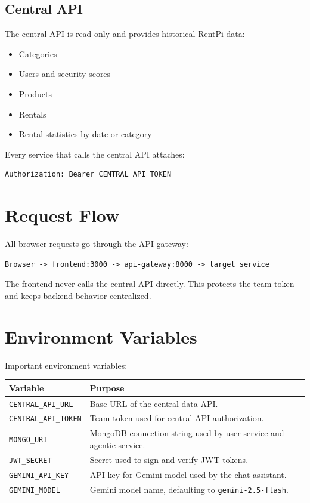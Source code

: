 \documentclass[11pt,a4paper]{article}
\begin{document}
\subsection{Central API}

The central API is read-only and provides historical RentPi data:

\begin{itemize}
  \item Categories
  \item Users and security scores
  \item Products
  \item Rentals
  \item Rental statistics by date or category
\end{itemize}

Every service that calls the central API attaches:

\begin{lstlisting}
Authorization: Bearer CENTRAL_API_TOKEN
\end{lstlisting}

\section{Request Flow}

All browser requests go through the API gateway:

\begin{lstlisting}
Browser -> frontend:3000 -> api-gateway:8000 -> target service
\end{lstlisting}

The frontend never calls the central API directly. This protects the team token and keeps backend behavior centralized.

\section{Environment Variables}

Important environment variables:

\begin{longtable}{|p{4cm}|p{10cm}|}
\hline
\textbf{Variable} & \textbf{Purpose} \\
\hline
\texttt{CENTRAL\_API\_URL} & Base URL of the central data API. \\
\hline
\texttt{CENTRAL\_API\_TOKEN} & Team token used for central API authorization. \\
\hline
\texttt{MONGO\_URI} & MongoDB connection string used by user-service and agentic-service. \\
\hline
\texttt{JWT\_SECRET} & Secret used to sign and verify JWT tokens. \\
\hline
\texttt{GEMINI\_API\_KEY} & API key for Gemini model used by the chat assistant. \\
\hline
\texttt{GEMINI\_MODEL} & Gemini model name, defaulting to \texttt{gemini-2.5-flash}. \\
\hline
\end{longtable}
\end{document}
